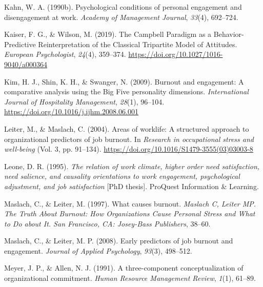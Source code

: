 \documentclass[
  man]{apa6}
\newlength{\cslhangindent}
\newlength{\cslentryspacingunit} %
\newenvironment{CSLReferences}[2] %
 {%
  \setlength{\parindent}{0pt}
  \ifodd #1
  \let\oldpar\par
  \def\par{\hangindent=\cslhangindent\oldpar}
  \fi
  \setlength{\parskip}{#2\cslentryspacingunit}
 }%
 {}
\begin{document}
\begin{CSLReferences}{1}{0}
\leavevmode{}%
Kahn, W. A. (1990b). Psychological conditions of personal engagement and disengagement at work. \emph{Academy of Management Journal}, \emph{33}(4), 692--724.

\leavevmode{}%
Kaiser, F. G., \& Wilson, M. (2019). The {Campbell} {Paradigm} as a {Behavior}-{Predictive} {Reinterpretation} of the {Classical} {Tripartite} {Model} of {Attitudes}. \emph{European Psychologist}, \emph{24}(4), 359--374. \url{https://doi.org/10.1027/1016-9040/a000364}

\leavevmode{}%
Kim, H. J., Shin, K. H., \& Swanger, N. (2009). Burnout and engagement: {A} comparative analysis using the {Big} {Five} personality dimensions. \emph{International Journal of Hospitality Management}, \emph{28}(1), 96--104. \url{https://doi.org/10.1016/j.ijhm.2008.06.001}

\leavevmode{}%
Leiter, M., \& Maslach, C. (2004). Areas of worklife: A structured approach to organizational predictors of job burnout. In \emph{Research in occupational stress and well-being} (Vol. 3, pp. 91--134). \url{https://doi.org/10.1016/S1479-3555(03)03003-8}

\leavevmode{}%
Leone, D. R. (1995). \emph{The relation of work climate, higher order need satisfaction, need salience, and causality orientations to work engagement, psychological adjustment, and job satisfaction} {[}PhD thesis{]}. ProQuest Information \& Learning.

\leavevmode{}%
Maslach, C., \& Leiter, M. (1997). What causes burnout. \emph{Maslach C, Leiter MP. The Truth About Burnout: How Organizations Cause Personal Stress and What to Do about It. San Francisco, CA: Josey-Bass Publishers}, 38--60.

\leavevmode{}%
Maslach, C., \& Leiter, M. P. (2008). Early predictors of job burnout and engagement. \emph{Journal of Applied Psychology}, \emph{93}(3), 498--512.

\leavevmode{}%
Meyer, J. P., \& Allen, N. J. (1991). A three-component conceptualization of organizational commitment. \emph{Human Resource Management Review}, \emph{1}(1), 61--89.


\end{CSLReferences}
\end{document}
